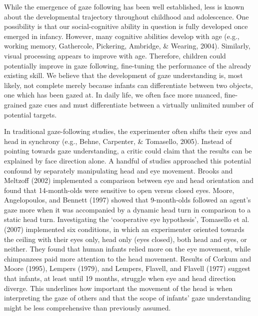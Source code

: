 \documentclass[
  man,mask,floatsintext]{apa6}
\begin{document}
While the emergence of gaze following has been well established, less is known about the developmental trajectory throughout childhood and adolescence. One possibility is that our social-cognitive ability in question is fully developed once emerged in infancy. However, many cognitive abilities develop with age (e.g., working memory, Gathercole, Pickering, Ambridge, \& Wearing, 2004). Similarly, visual processing appears to improve with age. Therefore, children could potentially improve in gaze following, fine-tuning the performance of the already existing skill. We believe that the development of gaze understanding is, most likely, not complete merely because infants can differentiate between two objects, one which has been gazed at. In daily life, we often face more nuanced, fine-grained gaze cues and must differentiate between a virtually unlimited number of potential targets.

In traditional gaze-following studies, the experimenter often shifts their eyes and head in synchrony (e.g., Behne, Carpenter, \& Tomasello, 2005). Instead of pointing towards gaze understanding, a critic could claim that the results can be explained by face direction alone. A handful of studies approached this potential confound by separately manipulating head and eye movement. Brooks and Meltzoff (2002) implemented a comparison between eye and head orientation and found that 14-month-olds were sensitive to open versus closed eyes. Moore, Angelopoulos, and Bennett (1997) showed that 9-month-olds followed an agent's gaze more when it was accompanied by a dynamic head turn in comparison to a static head turn. Investigating the `cooperative eye hypothesis', Tomasello et al. (2007) implemented six conditions, in which an experimenter oriented towards the ceiling with their eyes only, head only (eyes closed), both head and eyes, or neither. They found that human infants relied more on the eye movement, while chimpanzees paid more attention to the head movement. Results of Corkum and Moore (1995), Lempers (1979), and Lempers, Flavell, and Flavell (1977) suggest that infants, at least until 19 months, struggle when eye and head direction diverge. This underlines how important the movement of the head is when interpreting the gaze of others and that the scope of infants' gaze understanding might be less comprehensive than previously assumed.
\end{document}
